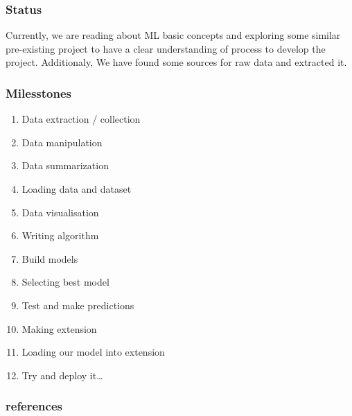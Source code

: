 \documentclass[14pt]{beamer}
\begin{document}
\begin{frame}
    \frametitle{Status}
    Currently, we are reading about ML basic concepts and exploring some similar pre-existing project to have a clear understanding of process to develop the project. Additionaly, We have found some sources for raw data and extracted it.
\end{frame}

\begin{frame}
    \frametitle{Milesstones}
    \begin{enumerate}
        \item{Data extraction / collection}
        \item{Data manipulation}
        \item{Data summarization}
        \item{Loading data and dataset}
        \item{Data visualisation}
        \item{Writing algorithm}
        \item{Build models}
        \item{Selecting best model}
        \item{Test and make predictions}
        \item{Making extension}
        \item{Loading our model into extension}
        \item{Try and deploy it…}
    \end{enumerate}
\end{frame}

\begin{frame}
    \frametitle{references}
    \href{https://github.com/arvind-rs/phishing_detector}{}
    \href{https://github.com/faizann24/phishytics-machine-learning-for-phishing}{}
    \href{https://machinelearningmastery.com/machine-learning-in-python-step-by-step/}{}
\end{frame}
\end{document}
